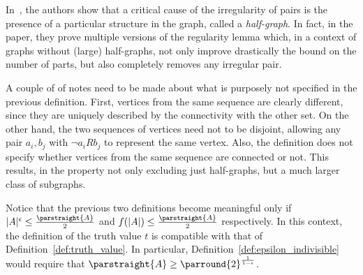 
In~\cite{regularity_lemmas_for_stable_graphs}, the authors show that a critical
cause of the irregularity of pairs is the presence of a particular structure in the graph, called a \emph{half-graph}.
In fact, in the paper, they prove multiple versions of the regularity lemma which, in a context of graphs without (large)
half-graphs, not only improve drastically the bound on the number of parts, but also completely removes any irregular pair.


        A couple of of notes need to be made about what is purposely not specified in the previous definition.
        First, vertices from the same sequence are clearly different, since they are uniquely described by the
        connectivity with the other set.
        On the other hand, the two sequences of vertices need not to be disjoint, allowing any pair $a_i, b_j$ with
        $\neg a_i R b_j$ to represent the same vertex.
        Also, the definition does not specify whether vertices from the same sequence are connected or not.
        This results, in the property not only excluding just half-graphs, but a much larger class of subgraphs.


    \remark
        Notice that the previous two definitions become meaningful only if $|A|^{\epsilon} \leq \frac{\parstraight{A}}{2}$ and
        $f(|A|) \leq \frac{\parstraight{A}}{2}$ respectively.
        In this context, the definition of the truth value $t$ is compatible with that of Definition~\ref{def:truth_value}.
        In particular, Definition~\ref{def:epsilon_indivisible} would require that $\parstraight{A} \geq \parround{2}^{\frac{1}{1-\epsilon}}$.


